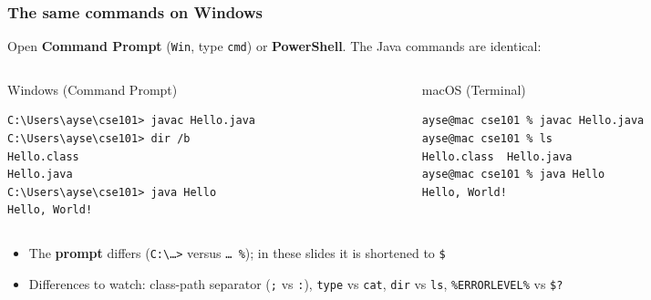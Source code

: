 \documentclass[aspectratio=169,10pt,compress]{beamer}
\begin{document}
\begin{frame}[t,fragile] \frametitle{The same commands on Windows}
  \small Open \textbf{Command Prompt} (\texttt{Win}, type \texttt{cmd}) or \textbf{PowerShell}. The Java commands are identical:
  \begin{columns}[T]
    \begin{column}{0.48\textwidth}
      \begin{block}{Windows (Command Prompt)}


\begin{lstlisting}[style=codesnippet, language={}, basicstyle=\ttfamily\scriptsize]
C:\Users\ayse\cse101> javac Hello.java
C:\Users\ayse\cse101> dir /b
Hello.class
Hello.java
C:\Users\ayse\cse101> java Hello
Hello, World!
\end{lstlisting}


      \end{block}
    \end{column}
    \begin{column}{0.48\textwidth}
      \begin{block}{macOS (Terminal)}


\begin{lstlisting}[style=codesnippet, language=bash, basicstyle=\ttfamily\scriptsize]
ayse@mac cse101 % javac Hello.java
ayse@mac cse101 % ls
Hello.class  Hello.java
ayse@mac cse101 % java Hello
Hello, World!
\end{lstlisting}


      \end{block}
    \end{column}
  \end{columns}

  \vspace{0.2em}
  \begin{itemize}\small
    \item The \textbf{prompt} differs (\texttt{C:\textbackslash\dots>} versus \texttt{\dots\ \%}); in these slides it is shortened to \texttt{\$}
    \item Differences to watch: class-path separator (\texttt{;} vs \texttt{:}), \texttt{type} vs \texttt{cat}, \texttt{dir} vs \texttt{ls}, \texttt{\%ERRORLEVEL\%} vs \texttt{\$?}
  \end{itemize}
\end{frame}
\end{document}
